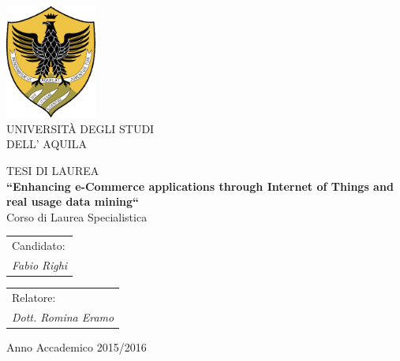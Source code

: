 


\thispagestyle{empty}
\begin{center}

        \includegraphics[width=3cm]{images/logo}\\
\vspace{1cm}
       {\Huge UNIVERSIT\`A DEGLI STUDI}\\
        \vspace{8mm}                                                  %
        {\Huge DELL' AQUILA}\\
        \vspace{1.3cm}
        \vspace{2.2cm}

         {\Large TESI DI LAUREA} \\

        \vspace{8mm}
        {\LARGE \bfseries ``Enhancing e-Commerce applications through Internet of Things and real usage data mining``} \\
        \vspace{2.8cm}
        {\large Corso di Laurea Specialistica}\\
        \vspace{18mm}
    \end{center}
\vspace{20mm}
   \begin{tabular}{l}
        { Candidato:}\\
        { \textit{Fabio Righi}}\\
      \end{tabular}
    \hfill
    \begin{tabular}{l}
        { Relatore:}\\
        { \textit{Dott.  Romina Eramo}}\\
    \end{tabular}
\vspace{20mm}
\begin{center}
{\large Anno Accademico 2015/2016}
\end{center}
